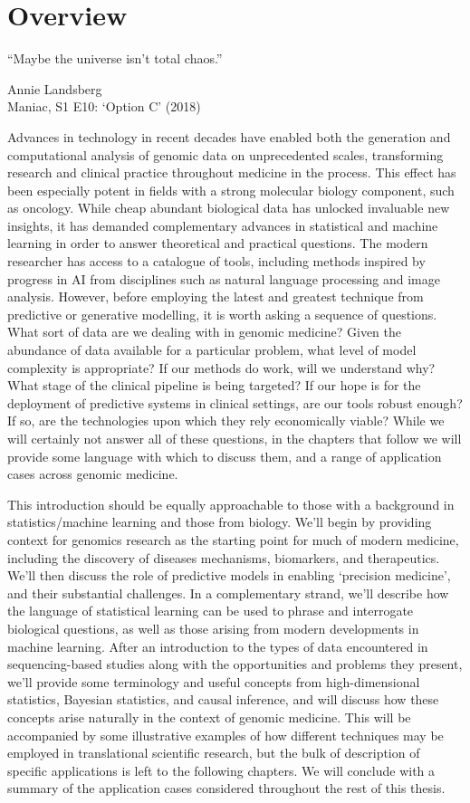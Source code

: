 \documentclass[thesis.tex]{subfiles}
\begin{document}
\section*{Overview} 
\epigraph{``Maybe the universe isn’t total chaos.''}{Annie Landsberg \\ Maniac, S1 E10: `Option C' (2018)}
Advances in technology in recent decades have enabled both the generation and computational analysis of genomic data on unprecedented scales, transforming research and clinical practice throughout medicine in the process.
This effect has been especially potent in fields with a strong molecular biology component, such as oncology. While cheap abundant biological data has unlocked invaluable new insights, it has demanded complementary advances in statistical and machine learning in order to answer theoretical and practical questions. The modern researcher has access to a catalogue of tools, including methods inspired by progress in AI from disciplines such as natural language processing and image analysis. However, before employing the latest and greatest technique 
from predictive or generative modelling, it is worth asking a sequence of questions. What sort of data are we dealing with in genomic medicine? Given the abundance of data available for a particular problem, what level of model complexity is appropriate? If our methods do work, will we understand why? What stage of the clinical pipeline is being targeted? If our hope is for the deployment of predictive systems in clinical settings, are our tools robust enough? If so, are the technologies upon which they rely economically viable? While we will certainly not answer all of these questions, in the chapters that follow we will provide some language with which to discuss them, and a range of application cases across genomic medicine. 

This introduction should be equally approachable to those with a background in statistics/machine learning and those from biology. We'll begin by providing context for genomics research as the starting point for much of modern medicine, including the discovery of diseases mechanisms, biomarkers, and therapeutics. We'll then discuss the role of predictive models in enabling `precision medicine', and their substantial challenges. In a complementary strand, we'll describe how the language of statistical learning can be used to phrase and interrogate biological questions, as well as those arising from modern developments in machine learning. After an introduction to the types of data encountered in sequencing-based studies along with the opportunities and problems they present, we'll provide some terminology and useful concepts from high-dimensional statistics, Bayesian statistics, and causal inference, and will discuss how these concepts arise naturally in the context of genomic medicine. This will be accompanied by some illustrative examples of how different techniques may be employed in translational scientific research, but the bulk of description of specific applications is left to the following chapters. We will conclude with a summary of the application cases considered throughout the rest of this thesis.
\end{document}
